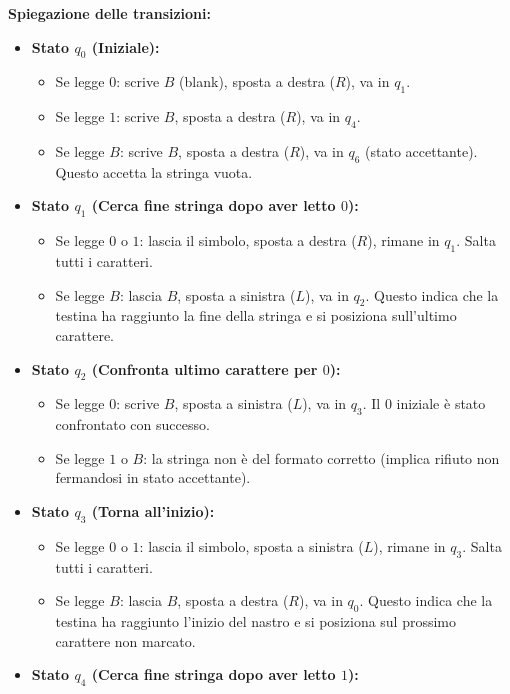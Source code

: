 \documentclass[a4paper]{article}
\begin{document}
\vspace{0.5cm}
\noindent \textbf{Spiegazione delle transizioni:}
\begin{itemize}
    \item \textbf{Stato $q_0$ (Iniziale):}
    \begin{itemize}
        \item Se legge $0$: scrive $B$ (blank), sposta a destra ($R$), va in $q_1$.
        \item Se legge $1$: scrive $B$, sposta a destra ($R$), va in $q_4$.
        \item Se legge $B$: scrive $B$, sposta a destra ($R$), va in $q_6$ (stato accettante). Questo accetta la stringa vuota.
    \end{itemize}
    \item \textbf{Stato $q_1$ (Cerca fine stringa dopo aver letto $0$):}
    \begin{itemize}
        \item Se legge $0$ o $1$: lascia il simbolo, sposta a destra ($R$), rimane in $q_1$. Salta tutti i caratteri.
        \item Se legge $B$: lascia $B$, sposta a sinistra ($L$), va in $q_2$. Questo indica che la testina ha raggiunto la fine della stringa e si posiziona sull'ultimo carattere.
    \end{itemize}
    \item \textbf{Stato $q_2$ (Confronta ultimo carattere per $0$):}
    \begin{itemize}
        \item Se legge $0$: scrive $B$, sposta a sinistra ($L$), va in $q_3$. Il $0$ iniziale è stato confrontato con successo.
        \item Se legge $1$ o $B$: la stringa non è del formato corretto (implica rifiuto non fermandosi in stato accettante).
    \end{itemize}
    \item \textbf{Stato $q_3$ (Torna all'inizio):}
    \begin{itemize}
        \item Se legge $0$ o $1$: lascia il simbolo, sposta a sinistra ($L$), rimane in $q_3$. Salta tutti i caratteri.
        \item Se legge $B$: lascia $B$, sposta a destra ($R$), va in $q_0$. Questo indica che la testina ha raggiunto l'inizio del nastro e si posiziona sul prossimo carattere non marcato.
    \end{itemize}
    \item \textbf{Stato $q_4$ (Cerca fine stringa dopo aver letto $1$):}

\end{itemize}
\end{document}
